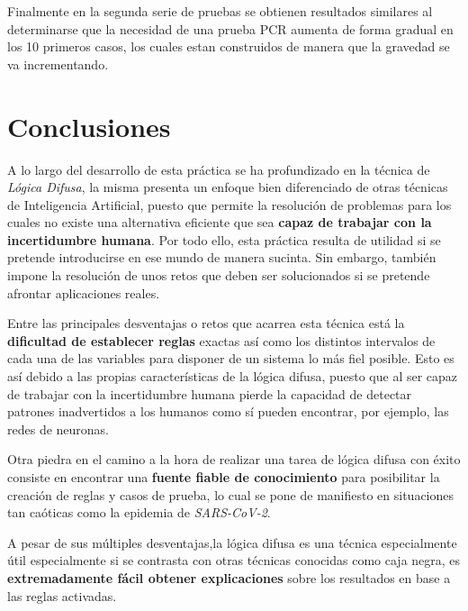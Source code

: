 \documentclass[12pt,a4paper, xcolor=table]{article}
\begin{document}
  \vspace{2mm}

  Finalmente en la segunda serie de pruebas se obtienen resultados similares al determinarse que la necesidad de una prueba PCR aumenta de forma gradual en los 10 primeros casos, los cuales estan construidos de manera que la gravedad se va incrementando.


\section{Conclusiones}

  A lo largo del desarrollo de esta práctica se ha profundizado en la técnica de \textit{Lógica Difusa}, la misma presenta un enfoque bien diferenciado de otras técnicas de Inteligencia Artificial, puesto que permite la resolución de problemas para los cuales no existe una alternativa eficiente que sea \textbf{capaz de trabajar con la incertidumbre humana}. Por todo ello, esta práctica resulta de utilidad si se pretende introducirse en ese mundo de manera sucinta. Sin embargo, también impone la resolución de unos retos que deben ser solucionados si se pretende afrontar aplicaciones reales.

  \vspace{2mm}

  Entre las principales desventajas o retos que acarrea esta técnica está la \textbf{dificultad de establecer reglas} exactas así como los distintos intervalos de cada una de las variables para disponer de un sistema lo más fiel posible. Esto es así debido a las propias características de la lógica difusa, puesto que al ser capaz de trabajar con la incertidumbre humana pierde la capacidad de detectar patrones inadvertidos a los humanos como sí pueden encontrar, por ejemplo, las redes de neuronas.

  \vspace{2mm}


  Otra piedra en el camino a la hora de realizar una tarea de lógica difusa con éxito consiste en encontrar una \textbf{fuente fiable de conocimiento} para posibilitar la creación de reglas y casos de prueba, lo cual se pone de manifiesto en situaciones tan caóticas como la epidemia de \textit{SARS-CoV-2}.

  \vspace{2mm}

  A pesar de sus múltiples desventajas,la lógica difusa es una técnica especialmente útil especialmente si se contrasta con otras técnicas conocidas como caja negra, es \textbf{extremadamente fácil obtener explicaciones} sobre los resultados en base a las reglas activadas.
\end{document}
